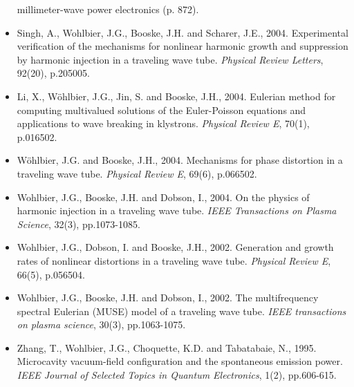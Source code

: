 \documentclass{muratcan_cv}
\begin{document}
\begin{itemize}
  millimeter-wave power electronics (p. 872).
\item Singh, A., Wohlbier, J.G., Booske, J.H. and Scharer, J.E.,
  2004. Experimental verification of the mechanisms for nonlinear
  harmonic growth and suppression by harmonic injection in a traveling
  wave tube. {\it Physical Review Letters}, 92(20), p.205005.
\item Li, X., Wöhlbier, J.G., Jin, S. and Booske, J.H., 2004. Eulerian
  method for computing multivalued solutions of the Euler-Poisson
  equations and applications to wave breaking in klystrons. {\it Physical
  Review E}, 70(1), p.016502.
\item Wöhlbier, J.G. and Booske, J.H., 2004. Mechanisms for phase
  distortion in a traveling wave tube. {\it Physical Review E}, 69(6),
  p.066502.
\item Wohlbier, J.G., Booske, J.H. and Dobson, I., 2004. On the
  physics of harmonic injection in a traveling wave tube. {\it IEEE
  Transactions on Plasma Science}, 32(3), pp.1073-1085.
\item Wohlbier, J.G., Dobson, I. and Booske, J.H., 2002. Generation
  and growth rates of nonlinear distortions in a traveling wave
  tube. {\it Physical Review E}, 66(5), p.056504.
\item Wohlbier, J.G., Booske, J.H. and Dobson, I., 2002. The
  multifrequency spectral Eulerian (MUSE) model of a traveling wave
  tube. {\it IEEE transactions on plasma science}, 30(3), pp.1063-1075.
\item Zhang, T., Wohlbier, J.G., Choquette, K.D. and Tabatabaie, N.,
  1995. Microcavity vacuum-field configuration and the spontaneous
  emission power. {\it IEEE Journal of Selected Topics in Quantum
  Electronics}, 1(2), pp.606-615.
\end{itemize}


%
\end{document}

